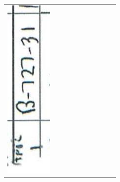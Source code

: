 \documentclass[10pt]{article}
\begin{document}
\begin{center}
\begin{tabular}{|c|c|c|c|c|c|c|c|c|c|}
\includegraphics[max width=\textwidth]{2025_02_27_dd68c3d38de88f0516d9g-096(7)}

\end{tabular}
\end{center}
\end{document}
